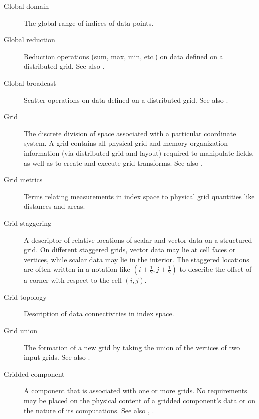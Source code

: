 \begin{description}
\item[Global domain] \label{glos:GlobDomain}
  The global range of indices of data points.

\item[Global reduction] \label{glos:GlobReduction} 
  Reduction operations (sum, max, min, etc.) on data defined on a distributed 
  grid.  See also .

\item[Global broadcast] \label{glos:GlobBroadcast}
  Scatter operations on data defined on a distributed grid.
  See also .

\item[Grid] \label{glos:Grid} The discrete division of space associated with
  a particular coordinate system.  A grid contains all physical grid and memory 
  organization information (via distributed grid and layout) required to manipulate 
  fields, as well as to create and execute grid transforms. 
  See also . 

\item[Grid metrics] \label{glos:GridMetrics} Terms relating measurements 
  in index space to physical grid quantities like distances and areas.

\item[Grid staggering] \label{glos:GridStagger} 
  A descriptor of relative locations
  of scalar and vector data on a structured grid. On different
  staggered grids, vector data may lie at cell faces or vertices,
  while scalar data may lie in the interior. The staggered locations
  are often written in a notation like $(i+\frac12,j+\frac12)$ to
  describe the offset of a corner with respect to the cell $(i,j)$.

\item[Grid topology] \label{glos:GridTopo} Description of data 
  connectivities in index space.

\item[Grid union] \label{glos:GridUnion} The formation of a new grid
  by taking the union of the vertices of two input grids.
  See also . 

\item[Gridded component] \label{glos:GridComp}
  A component that is associated with one or more grids.  No requirements 
  may be placed on the physical content of a gridded component's data or 
  on the nature of its computations. See also 
  , . 


\end{description}
